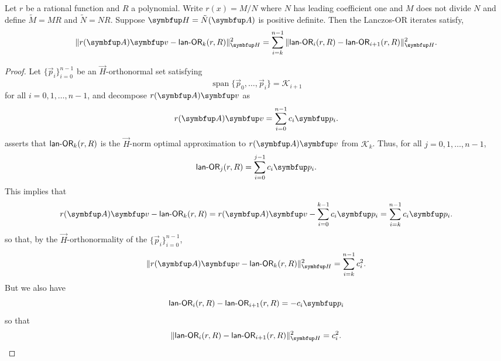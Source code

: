 \begin{theorem}
    \label{thm:OR_error}
Let \( r \) be a rational function and \( R \) a polynomial.
Write \( r(x) = M/N \) where \( N \) has leading coefficient one and \( M \) does not divide \( N \) and define \( \tilde{M} = MR \) and \( \tilde{N} = N R \).
Suppose \( \vec{H} = \tilde{N}\A \) is positive definite. 
Then the Lanczos-OR iterates satisfy,
\begin{equation*}
    \| r\A\vec{v} - \lanopt_k(r,R) \|_{\vec{H}}^2
    = \sum_{i=k}^{n-1}
    \| \lanopt_{i}(r,R) - \lanopt_{i+1}(r,R) \|_{\vec{H}}^2.
\end{equation*}

\end{theorem}

\begin{proof}
Let \( \{ \vec{p}_i \}_{i=0}^{n-1} \) be an \( \vec{H} \)-orthonormal set satisfying
\begin{equation*}
    \operatorname{span}\{\vec{p}_0, \ldots, \vec{p}_{i} \} 
    = \mathcal{K}_{i+1} 
\end{equation*}
for all \( i=0,1, \ldots, n-1 \), and decompose \( r\A\vec{v} \) as 
\begin{equation*}
    r\A\vec{v} = \sum_{i=0}^{n-1} c_i \vec{p}_i.
\end{equation*}
 asserts that \( \textup{\textsf{lan-OR}}_k(r,R) \) is the \( \vec{H} \)-norm optimal approximation to \( r\A\vec{v} \) from \( \mathcal{K}_k \).
Thus, for all \( j=0,1,\ldots, n-1 \), 
\begin{equation*}
    \lanopt_j(r,R) = \sum_{i=0}^{j-1} c_i \vec{p}_i.
\end{equation*}
This implies that
\begin{equation*}
    r\A\vec{v} - \lanopt_k(r,R) 
    = r\A\vec{v} - \sum_{i=0}^{k-1} c_i \vec{p}_i
    = \sum_{i=k}^{n-1} c_i \vec{p}_i.
\end{equation*}
    so that, by the \( \vec{H} \)-orthonormality of the \( \{ \vec{p}_i \}_{i=0}^{n-1} \),
\begin{equation*}
    \| r\A\vec{v} - \lanopt_k(r,R) \|_{\vec{H}}^2
    = \sum_{i=k}^{n-1} c_i^2.
\end{equation*}
    But we also have
    \begin{equation*}
        \lanopt_{i}(r,R) - \lanopt_{i+1}(r,R)
        = - c_i \vec{p}_i
    \end{equation*}
    so that
    \begin{equation*}
        \| \lanopt_{i}(r,R) - \lanopt_{i+1}(r,R) \|_{\vec{H}}^2 = c_i^2. \qedhere
    \end{equation*}
\end{proof}

